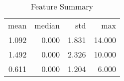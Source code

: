 \begin{table}[ht]
\centering
\caption{Feature Summary} 
\begin{tabular}{rrrr}
 mean & median & std & max \\ 
 1.092 & 0.000 & 1.831 & 14.000 \\ 
   \hline
1.492 & 0.000 & 2.326 & 10.000 \\ 
  0.611 & 0.000 & 1.204 & 6.000 \\ 
  \end{tabular}
\end{table}

